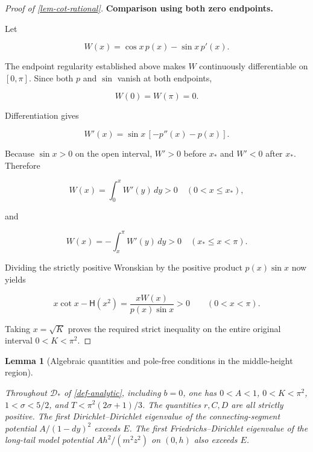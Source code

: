 \documentclass[11pt,a4paper]{article}
\theoremstyle{proofmanuscript}
\newtheorem{lemma}[theorem]{Lemma}
\begin{document}
\begin{proof}[Proof of \ref{lem-cot-rational}]
\textbf{Comparison using both zero endpoints.}

Let

\[
W(x)=\cos x\,p(x)-\sin x\,p'(x).
\]

The endpoint regularity established above makes \(W\) continuously differentiable on \([0,\pi]\). Since both \(p\) and \(\sin\) vanish at both endpoints,

\[
W(0)=W(\pi)=0.
\]

Differentiation gives

\[
W'(x)=\sin x\,[-p''(x)-p(x)].
\tag{R.7.9}
\]

Because \(\sin x>0\) on the open interval, \(W'>0\) before \(x_*\) and \(W'<0\) after \(x_*\). Therefore

\[
W(x)=\int_0^x W'(y)\,dy>0\quad(0<x\le x_*),
\]

and

\[
W(x)=-\int_x^\pi W'(y)\,dy>0\quad(x_*\le x<\pi).
\]

Dividing the strictly positive Wronskian by the positive product \(p(x)\sin x\) now yields

\[
x\cot x-\mathsf H(x^2)
=\frac{xW(x)}{p(x)\sin x}>0
\qquad(0<x<\pi).
\]

Taking \(x=\sqrt K\) proves the required strict inequality on the entire original interval \(0<K<\pi^2\).

\end{proof}

\begin{lemma}[Algebraic quantities and pole-free conditions in the middle-height region]\label{lem-pole-free}

Throughout \(\mathcal D_*\) of \ref{def-analytic}, including \(b=0\), one has \(0<A<1\), \(0<K<\pi^2\), \(1<\sigma<5/2\), and \(T<\pi^2(2\sigma+1)/3\). The quantities \(r,C,D\) are all strictly positive. The first Dirichlet--Dirichlet eigenvalue of the connecting-segment potential \(A/(1-dy)^2\) exceeds \(E\). The first Friedrichs--Dirichlet eigenvalue of the long-tail model potential \(Ah^2/(m^2z^2)\) on \((0,h)\) also exceeds \(E\).

\end{lemma}
\end{document}
